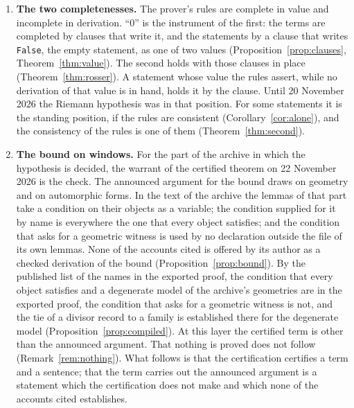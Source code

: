 \documentclass[11pt]{article}
\theoremstyle{definition}
\theoremstyle{remark}
\DeclareRobustCommand{\lean}[1]{{\renewcommand{\_}{\textunderscore\allowbreak}\texttt{#1}}}
\newcommand{\False}{\lean{False}}
\begin{document}
\begin{enumerate}[leftmargin=2em,itemsep=4pt]
\item \textbf{The two completenesses.} The prover's rules are complete in value and incomplete in derivation. ``0'' is the instrument of the first: the terms are completed by clauses that write it, and the statements by a clause that writes \False, the empty statement, as one of two values (Proposition~\ref{prop:clauses}, Theorem~\ref{thm:value}). The second holds with those clauses in place (Theorem~\ref{thm:rosser}). A statement whose value the rules assert, while no derivation of that value is in hand, holds it by the clause. Until 20 November 2026 the Riemann hypothesis was in that position. For some statements it is the standing position, if the rules are consistent (Corollary~\ref{cor:alone}), and the consistency of the rules is one of them (Theorem~\ref{thm:second}).

\item \textbf{The bound on windows.} For the part of the archive in which the hypothesis is decided, the warrant of the certified theorem on 22 November 2026 is the check. The announced argument for the bound draws on geometry and on automorphic forms. In the text of the archive the lemmas of that part take a condition on their objects as a variable; the condition supplied for it by name is everywhere the one that every object satisfies; and the condition that asks for a geometric witness is used by no declaration outside the file of its own lemmas. None of the accounts cited is offered by its author as a checked derivation of the bound (Proposition~\ref{prop:bound}). By the published list of the names in the exported proof, the condition that every object satisfies and a degenerate model of the archive's geometries are in the exported proof, the condition that asks for a geometric witness is not, and the tie of a divisor record to a family is established there for the degenerate model (Proposition~\ref{prop:compiled}). At this layer the certified term is other than the announced argument. That nothing is proved does not follow (Remark~\ref{rem:nothing}). What follows is that the certification certifies a term and a sentence; that the term carries out the announced argument is a statement which the certification does not make and which none of the accounts cited establishes.


\end{enumerate}
\end{document}
